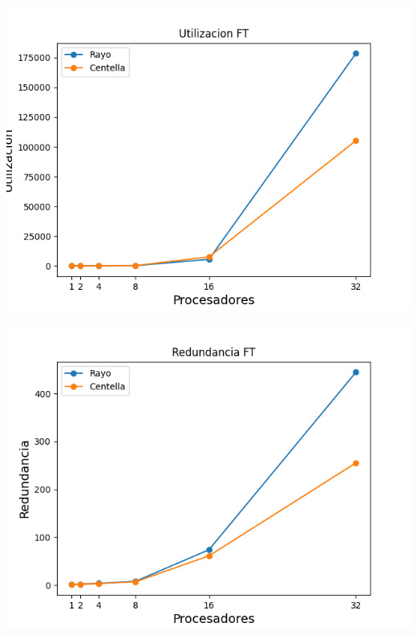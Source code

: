 \begin{center}
 \centering
  \begin{minipage}[b]{.49\textwidth}
  \includegraphics[width=1\linewidth]{plots/utilizacion-ft.png}
 \end{minipage}
 \begin{minipage}[b]{.49\textwidth}
  \includegraphics[width=1\linewidth]{plots/redundancy-ft.png}
 \end{minipage}
\end{center}

